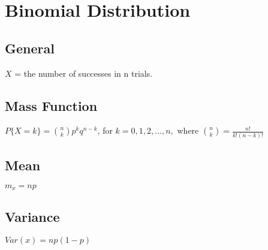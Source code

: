 \section*{Binomial Distribution}

\subsection*{General}
$X$ = the number of successes in n trials.

\subsection*{Mass Function}
$P\{X=k\} = \binom{n}{k}p^kq^{n-k}$, for $k=0,1,2,...,n,$ where $\binom{n}{k}=\frac{n!}{k!(n-k)!}$

\subsection*{Mean}
$m_x=np$

\subsection*{Variance}
$Var(x)=np(1-p)$
    

